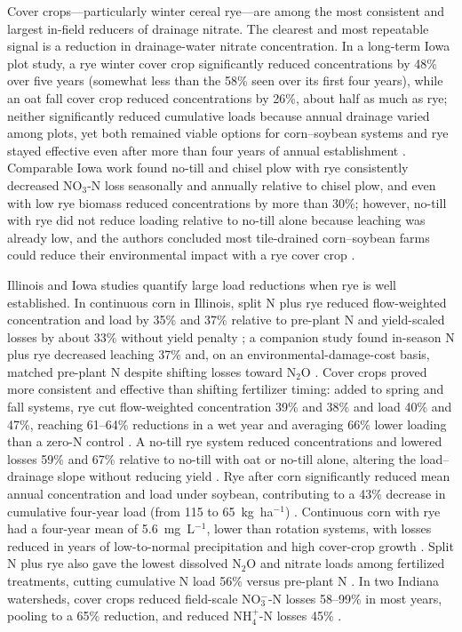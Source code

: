 Cover crops---particularly winter cereal rye---are among the most consistent and largest in-field reducers of drainage nitrate. The clearest and most repeatable signal is a reduction in drainage-water nitrate concentration. In a long-term Iowa plot study, a rye winter cover crop significantly reduced concentrations by 48\% over five years (somewhat less than the 58\% seen over its first four years), while an oat fall cover crop reduced concentrations by 26\%, about half as much as rye; neither significantly reduced cumulative loads because annual drainage varied among plots, yet both remained viable options for corn--soybean systems and rye stayed effective even after more than four years of annual establishment \parencite{Kaspar2012}. Comparable Iowa work found no-till and chisel plow with rye consistently decreased NO$_3$-N loss seasonally and annually relative to chisel plow, and even with low rye biomass reduced concentrations by more than 30\%; however, no-till with rye did not reduce loading relative to no-till alone because leaching was already low, and the authors concluded most tile-drained corn--soybean farms could reduce their environmental impact with a rye cover crop \parencite{Waring2020}.

Illinois and Iowa studies quantify large load reductions when rye is well established. In continuous corn in Illinois, split N plus rye reduced flow-weighted concentration and load by 35\% and 37\% relative to pre-plant N and yield-scaled losses by about 33\% without yield penalty \parencite{PrezaFontes2021}; a companion study found in-season N plus rye decreased leaching 37\% and, on an environmental-damage-cost basis, matched pre-plant N despite shifting losses toward N$_2$O \parencite{PrezaFontes2023}. Cover crops proved more consistent and effective than shifting fertilizer timing: added to spring and fall systems, rye cut flow-weighted concentration 39\% and 38\% and load 40\% and 47\%, reaching 61--64\% reductions in a wet year and averaging 66\% lower loading than a zero-N control \parencite{Ruffatti2019}. A no-till rye system reduced concentrations and lowered losses 59\% and 67\% relative to no-till with oat or no-till alone, altering the load--drainage slope without reducing yield \parencite{OBrien2022}. Rye after corn significantly reduced mean annual concentration and load under soybean, contributing to a 43\% decrease in cumulative four-year load (from 115 to 65~kg~ha$^{-1}$) \parencite{Gentry2024}. Continuous corn with rye had a four-year mean of 5.6~mg~L$^{-1}$, lower than rotation systems, with losses reduced in years of low-to-normal precipitation and high cover-crop growth \parencite{Daigh2015b}. Split N plus rye also gave the lowest dissolved N$_2$O and nitrate loads among fertilized treatments, cutting cumulative N load 56\% versus pre-plant N \parencite{Oliveira2025}. In two Indiana watersheds, cover crops reduced field-scale NO$_3^-$-N losses 58--99\% in most years, pooling to a 65\% reduction, and reduced NH$_4^+$-N losses 45\% \parencite{Vincent2025}.


